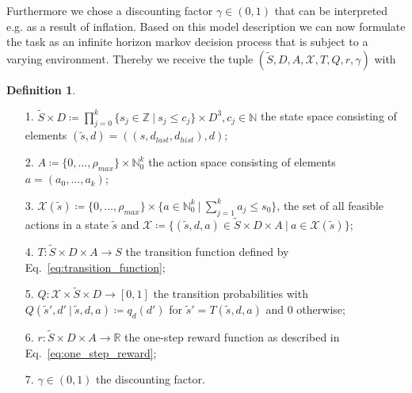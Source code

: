 \documentclass[journal, a4paper]{IEEEtran}
\theoremstyle{plain}
\theoremstyle{definition}
\newtheorem{defn}[thm]{Definition}
\begin{document}
Furthermore we chose a discounting factor $\gamma \in (0,1)$ that can be interpreted e.g. as a result of inflation. \newline Based on this model description we can now formulate the task as an infinite horizon markov decision process that is subject to a varying environment. Thereby we receive the tuple $(\tilde{S}, D, A, \mathcal{X}, T, Q, r, \gamma)$ with
\begin{defn} \label{def:modell} \
	\begin{itemize}
		\item[1.] $\tilde{S}  \times D \coloneqq \prod\limits_{j=0}^{k} \{s_j \in \mathbb{Z} \ | \ s_j \leq c_j\} \times D^3, c_j \in \mathbb{N}$ the state space consisting of elements $(\tilde{s}, d) = ((s, d_{last}, d_{hist}), d)$;
		\item[2.] $ A \coloneqq  \{0, ..., \rho_{max} \} \times \mathbb{N}_0^k$ the action space consisting of elements $a = (a_0, ..., a_k)$;
		\item[3.] $ \mathcal{X} (\tilde{s}) \coloneqq \{0, ..., \rho_{max} \} \times \{a \in \mathbb{N}_0^k \ | \ \sum_{j=1}^{k}a_j \leq s_0  \}$, the set of all feasible actions in a state $\tilde{s}$ and $\mathcal{X} \coloneqq \{(\tilde{s}, d , a) \in \tilde{S} \times D \times A \ | \ a \in \mathcal{X} (\tilde{s})\}$;
		\item[4.] $ T: \tilde{S}  \times D \times A \rightarrow S$ the transition function defined by Eq.~\eqref{eq:transition_function};
		\item[5.] $ Q: \mathcal{X} \times \tilde{S} \times D \rightarrow [0,1]  $ the transition probabilities with $Q(\tilde{s}', d'\ |\ \tilde{s}, d, a) \coloneqq q_d(d')$ for $\tilde{s}' = T(\tilde{s}, d, a)$ and $0$ otherwise;
		\item[6.] $ r: \tilde{S} \times D \times A \rightarrow \mathbb{R} $ the one-step reward function as described in Eq.~\eqref{eq:one_step_reward};
		\item[7.] $\gamma \in (0, 1) $ the discounting factor.
	\end{itemize}
\end{defn}
\end{document}
